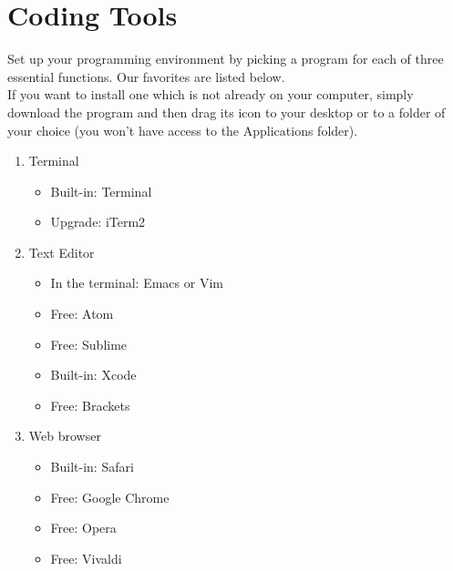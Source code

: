 \documentclass{42-en}
\begin{document}

\chapter{Coding Tools}

Set up your programming environment by picking a program for each of three essential functions. Our favorites are listed below.\\

If you want to install one which is not already on your computer, simply download the program and then drag its icon to your desktop or to a folder of your choice (you won't have access to the Applications folder). 

\begin{enumerate}
	\item Terminal
	\begin{itemize}
		\item Built-in: Terminal
		\item Upgrade: iTerm2
	\end{itemize}
	\item Text Editor
	\begin{itemize}
		\item In the terminal: Emacs or Vim
		\item Free: Atom
		\item Free: Sublime
		\item Built-in: Xcode
		\item Free: Brackets
	\end{itemize}
	\item Web browser
	\begin{itemize}
		\item Built-in: Safari
		\item Free: Google Chrome
		\item Free: Opera
		\item Free: Vivaldi
	\end{itemize}
\end{enumerate}

\end{document}
